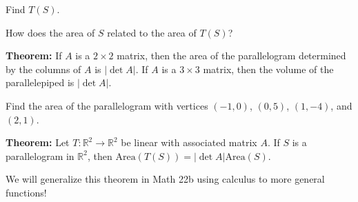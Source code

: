 \documentclass[12pt,letterpaper]{article}
\begin{document}
\begin{enumerate}
\Part Find $T(S)$.

\vfill

\Part How does the area of $S$ related to the area of $T(S)$?

\vfill

\newpage

{\bf Theorem:} If $A$ is a $2 \times 2$ matrix, then the area of the parallelogram determined by the columns of $A$ is $|\det{A}|$. If $A$ is a $3 \times 3$ matrix, then the volume of the parallelepiped is $|\det{A}|$.

\Problem Find the area of the parallelogram with vertices $(-1,0)$, $(0,5)$, $(1,-4)$, and $(2,1)$.

\vfill

{\bf Theorem:} Let $T: \mathbb{R}^2 \to \mathbb{R}^2$ be linear with associated matrix $A$. If $S$ is a parallelogram in $\mathbb{R}^2$, then $\text{Area}(T(S))=|\det{A}|\text{Area}(S)$. 


We will generalize this theorem in Math 22b using calculus to more general functions!



\end{enumerate}
\end{document}
